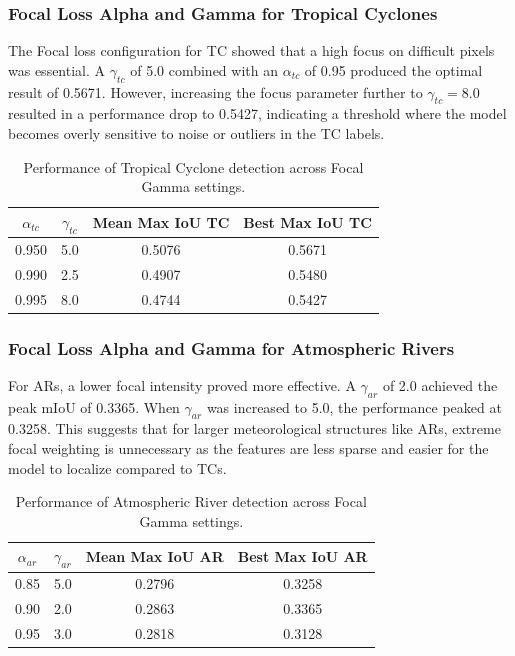 \subsubsection{Focal Loss Alpha and Gamma for Tropical Cyclones}
The Focal loss configuration for TC showed that a high focus on difficult pixels was essential. A $\gamma_{tc}$ of 5.0 combined with an $\alpha_{tc}$ of 0.95 produced the optimal result of 0.5671. However, increasing the focus parameter further to $\gamma_{tc} = 8.0$ resulted in a performance drop to 0.5427, indicating a threshold where the model becomes overly sensitive to noise or outliers in the TC labels.

\begin{table}[h]
\centering
\begin{tabular}{@{}cccc@{}}
\toprule
$\alpha_{tc}$ & $\gamma_{tc}$ & Mean Max IoU TC& Best Max IoU TC\\ \midrule
0.950 & 5.0 & 0.5076 & 0.5671 \\
0.990 & 2.5 & 0.4907 & 0.5480 \\
0.995 & 8.0 & 0.4744 & 0.5427 \\ \bottomrule
\end{tabular}
\caption{Performance of Tropical Cyclone detection across Focal Gamma settings.}
\end{table}


\subsubsection{Focal Loss Alpha and Gamma for Atmospheric Rivers}
For ARs, a lower focal intensity proved more effective. A $\gamma_{ar}$ of 2.0 achieved the peak mIoU of 0.3365. When $\gamma_{ar}$ was increased to 5.0, the performance peaked at 0.3258. This suggests that for larger meteorological structures like ARs, extreme focal weighting is unnecessary as the features are less sparse and easier for the model to localize compared to TCs.

\begin{table}[h]
\centering
\begin{tabular}{@{}cccc@{}}
\toprule
$\alpha_{ar}$ & $\gamma_{ar}$ & Mean Max IoU AR& Best Max IoU AR\\ \midrule
0.85 & 5.0 & 0.2796 & 0.3258 \\
0.90 & 2.0 & 0.2863 & 0.3365 \\
0.95 & 3.0 & 0.2818 & 0.3128 \\ \bottomrule
\end{tabular}
\caption{Performance of Atmospheric River detection across Focal Gamma settings.}
\end{table}




